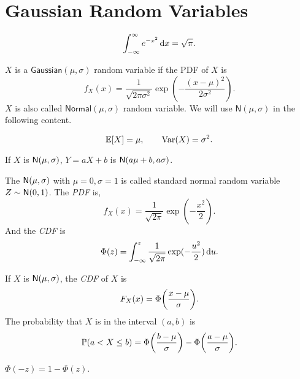 \section{Gaussian Random Variables}
\begin{theorem}
    \[\int_{-\infty}^{\infty}e^{-x^2}\mathop{}\!\mathrm{d} x=\sqrt{\pi}.\]
\end{theorem}

\begin{definition}
    $X$ is a $\mathsf{Gaussian}(\mu, \sigma)$ random variable if the \textrm{PDF} of $X$ is
    \[f_X(x)=\frac{1}{\sqrt{2\pi\sigma^2}}\exp(-\frac{(x-\mu)^2}{2\sigma^2}).\]
    $X$ is also called $\mathsf{Normal}(\mu,\sigma)$ random variable. We will use $\mathsf{N}(\mu, \sigma)$ in the following content.
\end{definition}

\begin{theorem}
    \[\E{X} = \mu, \qquad \Var(X) = \sigma^2.\]
\end{theorem}

\begin{theorem}
    If $X$ is $\mathsf{N}(\mu,\sigma)$, $Y=aX+b$ is $\mathsf{N}(a\mu+b,a\sigma)$.
\end{theorem}

\begin{theorem}
    The $\mathsf{N}(\mu,\sigma)$ with $\mu=0, \sigma=1$ is called standard normal random variable $Z\sim\mathsf{N}(0,1)$. The \emph{PDF} is,
    \[f_X(x)=\frac{1}{\sqrt{2\pi}}\exp(-\frac{x^2}{2}).\]
    And the \emph{CDF} is
    \[\Phi(z)=\int_{-\infty}^{z}\frac{1}{\sqrt{2\pi}}\exp(-\frac{u^2}{2})\mathop{}\!\mathrm{d} u.\]
\end{theorem}

\begin{theorem}
    If $X$ is $\mathsf{N}(\mu,\sigma)$, the \emph{CDF} of $X$ is
    \[F_X(x)=\Phi\parens*{\frac{x-\mu}{\sigma}}.\]
    The probability that $X$ is in the interval \emph{$(a,b)$} is
    \[\P{a<X\leq b}=\Phi\parens*{\frac{b-\mu}{\sigma}}-\Phi\parens*{\frac{a-\mu}{\sigma}}.\]
\end{theorem}

\begin{theorem}
    $\Phi(-z)=1-\Phi(z)$.
\end{theorem}


